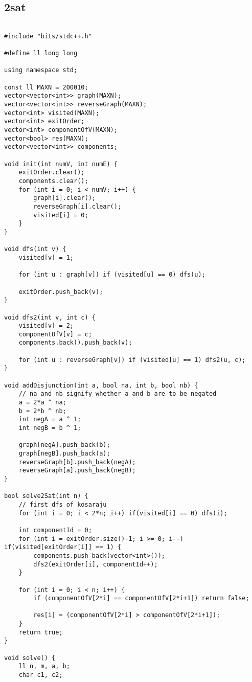 \documentclass[landscape,twocolumn,10pt,a4paper]{article}
\begin{document}
\subsection{2sat}
\begin{verbatim}

#include "bits/stdc++.h"

#define ll long long

using namespace std;

const ll MAXN = 200010;
vector<vector<int>> graph(MAXN);
vector<vector<int>> reverseGraph(MAXN);
vector<int> visited(MAXN);
vector<int> exitOrder;
vector<int> componentOfV(MAXN);
vector<bool> res(MAXN);
vector<vector<int>> components;

void init(int numV, int numE) {
    exitOrder.clear();
    components.clear();
    for (int i = 0; i < numV; i++) {
        graph[i].clear();
        reverseGraph[i].clear();
        visited[i] = 0;
    }
}

void dfs(int v) {
    visited[v] = 1;

    for (int u : graph[v]) if (visited[u] == 0) dfs(u);

    exitOrder.push_back(v);
}

void dfs2(int v, int c) {
    visited[v] = 2;
    componentOfV[v] = c;
    components.back().push_back(v);

    for (int u : reverseGraph[v]) if (visited[u] == 1) dfs2(u, c);
}

void addDisjunction(int a, bool na, int b, bool nb) {
    // na and nb signify whether a and b are to be negated 
    a = 2*a ^ na;
    b = 2*b ^ nb;
    int negA = a ^ 1;
    int negB = b ^ 1;

    graph[negA].push_back(b);
    graph[negB].push_back(a);
    reverseGraph[b].push_back(negA);
    reverseGraph[a].push_back(negB);
}

bool solve2Sat(int n) {
    // first dfs of kosaraju
    for (int i = 0; i < 2*n; i++) if(visited[i] == 0) dfs(i);

    int componentId = 0;
    for (int i = exitOrder.size()-1; i >= 0; i--) if(visited[exitOrder[i]] == 1) {
        components.push_back(vector<int>());
        dfs2(exitOrder[i], componentId++);
    }

    for (int i = 0; i < n; i++) {
        if (componentOfV[2*i] == componentOfV[2*i+1]) return false;

        res[i] = (componentOfV[2*i] > componentOfV[2*i+1]);
    }
    return true;
}

void solve() {
    ll n, m, a, b;
    char c1, c2;


\end{verbatim}
\end{document}
